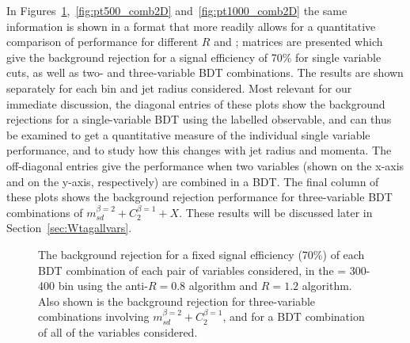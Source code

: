  In
Figures~\ref{fig:pt300_comb2D},~\ref{fig:pt500_comb2D}
and~\ref{fig:pt1000_comb2D} the same information is shown in a format
that more readily allows for a quantitative comparison of performance
for different $R$ and \pt; matrices are presented which give the
background rejection for a signal efficiency of 70\% for single variable cuts, as well as two- and three-variable BDT combinations. The results are shown separately for each \pt bin and jet radius
considered.  Most relevant for our immediate discussion, the diagonal entries of these plots show the background
rejections for a single-variable BDT using the labelled observable, and can thus be examined to get a
quantitative measure of the individual single variable performance,
and to study how this changes with jet radius and momenta. The off-diagonal
entries give the performance when two variables (shown on the x-axis and on the y-axis, respectively) are combined in
a BDT. The
final column of these plots shows the background rejection
performance for three-variable BDT combinations of $m_{sd}^{\beta=2} +
C_2^{\beta=1} + X$. These results will be discussed later in Section~\ref{sec:Wtagallvars}. 

\begin{figure}
\centering
{}
\caption{
The background rejection
for a fixed signal efficiency (70\%) of each BDT combination of
each pair of variables considered, in the \pt = 300-400 \GeV bin using the anti-\kT $R=0.8$
algorithm and $R=1.2$ algorithm. Also shown is the background
rejection for three-variable combinations involving $m_{sd}^{\beta=2} +
C_2^{\beta=1}$, and for a BDT combination of all of the variables considered.
}
\label{fig:pt300_comb2D}
\end{figure}


